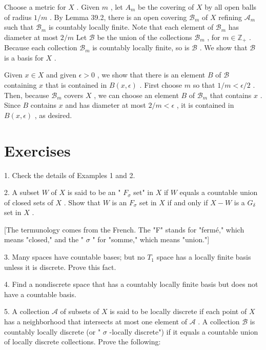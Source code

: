 Choose a metric for \(X\) . Given \(m\) , let \({A}_{m}\) be the covering of \(X\) by all open balls of radius \(1/m\) . By Lemma 39.2, there is an open covering \({\mathcal{B}}_{m}\) of \(X\) refining \({\mathcal{A}}_{m}\) such that \({\mathcal{B}}_{m}\) is countably locally finite. Note that each element of \({\mathcal{B}}_{m}\) has diameter at most \(2/m\) Let \(\mathcal{B}\) be the union of the collections \({\mathcal{B}}_{m}\) , for \(m \in  {\mathbb{Z}}_{ + }\) . Because each collection \({\mathcal{B}}_{m}\) is countably locally finite, so is \(\mathcal{B}\) . We show that \(\mathcal{B}\) is a basis for \(X\) .

Given \(x \in  X\) and given \(\epsilon  > 0\) , we show that there is an element \(B\) of \(\mathcal{B}\) containing \(x\) that is contained in \(B\left( {x,\epsilon }\right)\) . First choose \(m\) so that \(1/m < \epsilon /2\) . Then, because \({\mathcal{B}}_{m}\) covers \(X\) , we can choose an element \(B\) of \({\mathcal{B}}_{m}\) that contains \(x\) . Since \(B\) contains \(x\) and has diameter at most \(2/m < \epsilon\) , it is contained in \(B\left( {x,\epsilon }\right)\) , as desired.

\section*{Exercises}

1. Check the details of Examples 1 and 2.

2. A subset \(W\) of \(X\) is said to be an " \({F}_{\sigma }\) set" in \(X\) if \(W\) equals a countable union of closed sets of \(X\) . Show that \(W\) is an \({F}_{\sigma }\) set in \(X\) if and only if \(X - W\) is a \({G}_{\delta }\) set in \(X\) .

[The termunology comes from the French. The "F" stands for "fermé," which means "closed," and the " \(\sigma\) " for "somme," which means "union."]

3. Many spaces have countable bases; but no \({T}_{1}\) space has a locally finite basis unless it is discrete. Prove this fact.

4. Find a nondiscrete space that has a countably locally finite basis but does not have a countable basis.

5. A collection \(\mathcal{A}\) of subsets of \(X\) is said to be locally discrete if each point of \(X\) has a neighborhood that intersects at most one element of \(\mathcal{A}\) . A collection \(\mathcal{B}\) is countably locally discrete (or " \(\sigma\) -locally discrete") if it equals a countable union of locally discrete collections. Prove the following:

